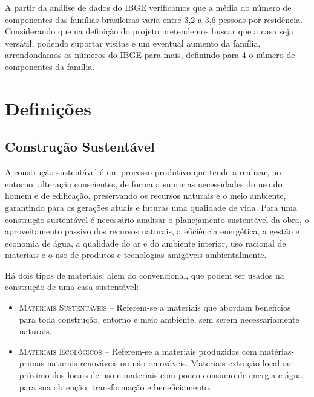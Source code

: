 	A partir da análise de dados do IBGE\cite{2010IBGE} verificamos que a média do número de componentes das famílias brasileiras varia entre 3,2 a 3,6 pessoas por residência. Considerando que na definição do projeto pretendemos buscar que a casa seja versátil, podendo suportar visitas e um eventual aumento da família, arrendondamos os números do IBGE\cite{2010IBGE} para mais, definindo para 4 o número de componentes da família. 

\newpage

\section{Definições}

\subsection{Construção Sustentável}
	
	A construção sustentável é um processo produtivo que tende a realizar, no entorno, alteração conscientes, de forma a suprir as necessidades do uso do homem e de edificação, preservando os recursos naturais e o meio ambiente, garantindo para as gerações atuais e futuras uma qualidade de vida\cite{1992Baroni}. Para uma construção sustentável é necessário analisar o planejamento sustentável da obra, o aproveitamento passivo dos recursos naturais, a eficiência energética, a gestão e economia de água, a qualidade do ar e do ambiente interior, uso racional de materiais e o uso de produtos e tecnologias amigáveis ambientalmente\cite{2012Araujo}.

Há dois tipos de materiais, além do convencional, que podem ser usados na construção de uma casa sustentável:

\begin{itemize}

	\item \textsc{Materiais Sustentáveis} -- Referem-se a materiais que abordam benefícios para toda construção, entorno e meio ambiente, sem serem necessariamente naturais. 

	\item \textsc{Materiais Ecológicos} -- Referem-se a materiais produzidos com matérias-primas naturais renováveis ou não-renováveis. Materiais extração local ou próximo dos locais de uso e materiais com pouco consumo de energia e água para sua obtenção, transformação e beneficiamento.

\end{itemize}

